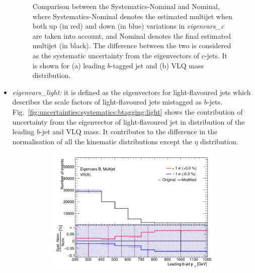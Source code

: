 \begin{itemize}
\begin{figure}[hbt!]
\begin{subfigure}{.35\textwidth}
			\caption{}
			\label{fig:uncertainties:systematics:btagging:c:vlqm}
		\end{subfigure}
		\caption{Comparison between the Systematics-Nominal and Nominal, where Systematics-Nominal denotes the estimated multijet when both up (in red) and down (in blue) variations in \textit{eigenvars\_c} are taken into account, and Nominal denotes the final estimated multijet (in black). The difference between the two is considered as the systematic uncertainty from the eigenvectors of $c$-jets. It is shown for (a) leading $b$-tagged jet \pt and (b) VLQ mass distribution.}
		\label{fig:uncertainties:systematics:btagging:c}
	\end{figure}

	\item \textit{eigenvars\_light:} it is defined as the eigenvectors for light-flavoured jets which describes the scale factors of light-flavoured jets mistagged as $b$-jets. Fig.\ \ref{fig:uncertainties:systematics:btagging:light} shows the contribution of uncertainty from the eigenvector of light-flavoured jet in \pt distribution of the leading $b$-jet and VLQ mass. It contributes to the difference in the normalisation of all the kinematic distributions except the $\eta$ distribution.
	\begin{figure}[hbt!]
		\centering
		\graphicspath{{figs/chapter6/Systematics/EigenvarsLight/}}
		\begin{subfigure}{.35\textwidth}
			\centering
			\includegraphics[width=\linewidth,height=\textheight,keepaspectratio]{VR_B_jet_pt_Multijets.png}
			\caption{}
			\label{fig:uncertainties:systematics:btagging:light:jetpt}
		\end{subfigure}\hspace{0.6cm}

\end{figure}
\end{itemize}
